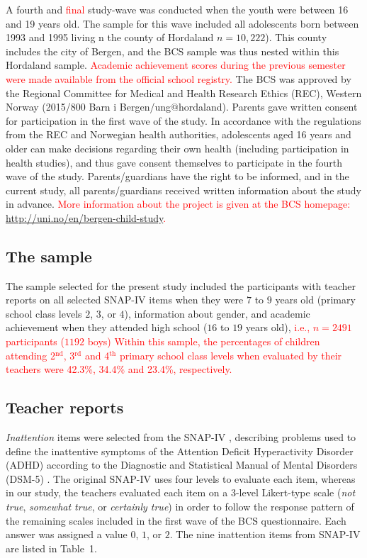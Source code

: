 \documentclass[10pt,letterpaper]{article}
\begin{document}
A fourth and \textcolor{red} {final} study-wave was conducted when the youth were between 16 and 19 years old. The sample for this wave included all adolescents born between 1993 and 1995 living n the county of Hordaland $n=10,222$). This county includes the city of Bergen, and the BCS sample was thus nested within this Hordaland sample. \textcolor{red} { Academic achievement scores  during the previous semester were made available from the official school registry.}  The BCS was approved by the Regional Committee for Medical and Health Research Ethics (REC), Western Norway (2015/800 Barn i Bergen/ung$@$hordaland). Parents gave written consent for participation in the first wave of the study. In accordance with the regulations from the REC and Norwegian health authorities, adolescents aged 16 years and older can make decisions regarding their own health (including participation in health studies), and thus gave consent themselves to participate in the fourth wave of the study. Parents/guardians have the right to be informed, and in the current study, all parents/guardians received written information about the study in advance.
\textcolor{red}{More information about the project is given at the BCS homepage: {\small \url{http://uni.no/en/bergen-child-study}}.}

\vspace{3mm}
\subsection*{The sample}
The sample selected for the present study included the participants with teacher reports on all selected SNAP-IV items when they were $7$ to $9$ years old (primary school class levels $2$, $3$, or $4$), information about gender, and academic achievement when they attended high school ($16$ to $19$ years old), \textcolor{red}{i.e., $n=2491$ participants ($1192$ boys)}
\textcolor{red}{Within this sample, the percentages of children attending 2$^{\text{nd}}$, 3$^{\text{rd}}$ and 4$^{\text{th}}$ primary school
 class levels when evaluated by their teachers were 
\textcolor{red}{42.3\%, 34.4\% and 23.4\%}, respectively.}

\vspace{3mm}
\subsection*{Teacher reports}
\emph{Inattention} items were selected from the SNAP-IV \cite{Swanson1992}, describing problems used to define the inattentive symptoms of the Attention Deficit Hyperactivity Disorder (ADHD) according to the Diagnostic and Statistical Manual of Mental Disorders (DSM-5) \cite{APA2013}. The original SNAP-IV uses four levels to evaluate each item, whereas in our study, the teachers evaluated each item on a 3-level Likert-type scale (\emph{not true}, \emph{somewhat true}, or \emph{certainly true}) in order to follow the response pattern of the remaining scales included in the first wave of the BCS questionnaire. Each answer was assigned a value $0$, $1$, or $2$. 
The  nine inattention items from SNAP-IV are listed in Table~1. 
\end{document}
